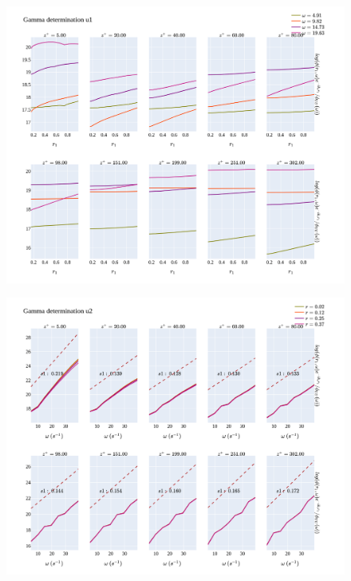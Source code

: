 \documentclass[]{article}
\theoremstyle{plain}
\theoremstyle{remark}
\begin{document}
\begin{figure}[h!]
	\begin{center}
		\includegraphics[width=\textwidth]{../output/channel_wrles_retau395/split_time/gamma/gamma_u1_r_all.png}
	\end{center}
\end{figure}

\begin{figure}[h!]
	\begin{center}
		\includegraphics[width=\textwidth]{../output/channel_wrles_retau395/split_time/gamma/gamma_u2_w_all.png}
	\end{center}
\end{figure}
\end{document}
